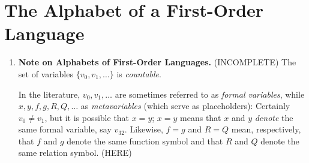\section{The Alphabet of a First-Order Language}
\begin{enumerate}[1.]
%
\item \textbf{Note on Alphabets of First-Order Languages.} (INCOMPLETE) The set of variables $\{ v_0, v_1, \ldots \}$ is \emph{countable}.\par
In the literature, $v_0, v_1, \ldots$ are sometimes referred to as \emph{formal variables}, while $x, y, f, g, R, Q, \ldots$ as \emph{metavariables} (which serve as placeholders): Certainly $v_0 \neq v_1$, but it is possible that $x = y$; $x = y$ means that $x$ and $y$ \emph{denote} the same formal variable, say $v_{32}$. Likewise, $f = g$ and $R = Q$ mean, respectively, that $f$ and $g$ denote the same function symbol and that $R$ and $Q$ denote the same relation symbol. (HERE)
%
\end{enumerate}
\ 
\\
\\
